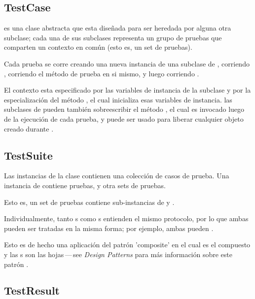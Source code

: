 \documentclass[a4paper,10pt,twoside]{book}
\begin{document}
\subsection{TestCase}

 es una clase abstracta que esta dise\~nada para ser heredada por alguna otra subclase;
cada una de sus subclases representa un grupo de pruebas que comparten un contexto en com\'un (esto es, un set de pruebas).

Cada prueba se corre creando una nueva instancia de una subclase de ,
corriendo , corriendo el m\'etodo de prueba en si mismo, y luego
corriendo .


El contexto esta especificado por las variables de instancia de la subclase y por la 
especializaci\'on del m\'etodo , el cual inicializa esas variables
de instancia. las subclases de  pueden tambi\'en sobreescribir el m\'etodo
, el cual es invocado luego de la ejecuci\'on de cada prueba, y puede ser usado para
liberar cualquier objeto creado durante .


\subsection{TestSuite}

Las instancias de la clase  contienen una colecci\'on de casos de prueba.
Una instancia de  contiene pruebas, y otra sets de pruebas.

Esto es, un set de pruebas contiene sub-instancias de  y .

Individualmente, tanto s como s entienden el mismo protocolo,
por lo que ambas pueden ser tratadas en la misma forma; por ejemplo, ambas pueden .

Esto es de hecho una aplicaci\'on del patr\'on 'composite' en el cual  es el compuesto
y las s son las hojas\,---\,see \textit{Design Patterns} para m\'as informaci\'on sobre este patr\'on \cite{Gamm95a}.

\subsection{TestResult}
\end{document}
